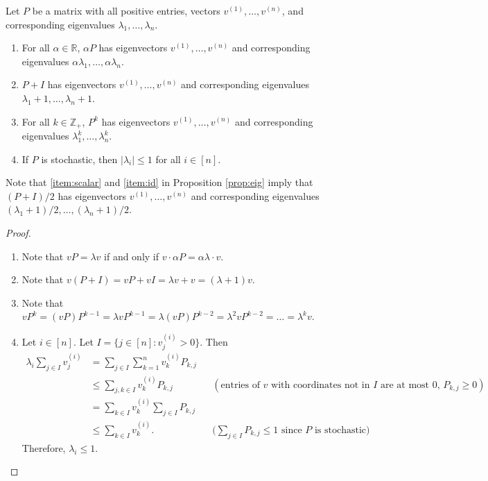 \documentclass[letterpaper, reqno,11pt]{article}
\newcommand{\RR}{\mathbb{R}}
\newcommand{\ZZ}{\mathbb{Z}}
\begin{document}
\begin{proposition} \label{prop:eig}
  Let $P$ be a matrix with all positive entries, vectors $v^{(1)}, \ldots, v^{(n)}$, and corresponding eigenvalues $\lambda_1, \ldots, \lambda_n$.
  \begin{enumerate}[itemsep=0pt, label=(\roman*)]
    \item \label{item:scalar} For all $\alpha \in \RR$, $\alpha P$ has eigenvectors $v^{(1)}, \ldots, v^{(n)}$ and corresponding eigenvalues $\alpha \lambda_1, \ldots, \alpha \lambda_n$.
    \item \label{item:id} $P + I$ has eigenvectors $v^{(1)}, \ldots, v^{(n)}$ and corresponding eigenvalues $\lambda_1 + 1, \ldots, \lambda_n + 1$.
    \item For all $k \in \ZZ_+$, $P^k$ has eigenvectors $v^{(1)}, \ldots, v^{(n)}$ and corresponding eigenvalues $\lambda_1^k, \ldots, \lambda_n^k$.
    \item If $P$ is stochastic, then $|\lambda_i| \leq 1$ for all $i \in [n]$.
  \end{enumerate}
\end{proposition}

Note that \ref{item:scalar} and \ref{item:id} in Proposition \ref{prop:eig} imply that $(P + I)/2$ has eigenvectors $v^{(1)}, \ldots, v^{(n)}$ and corresponding eigenvalues $(\lambda_1 + 1)/2, \ldots, (\lambda_n + 1)/2$.

\begin{proof}
  \begin{enumerate}[itemsep=0pt, label=(\roman*)]
    \item Note that $vP = \lambda v$ if and only if $v \cdot \alpha P = \alpha \lambda \cdot v$.
    \item Note that $v(P + I) = vP + vI = \lambda v + v = (\lambda + 1)v$.
    \item Note that $vP^k = (vP)P^{k - 1} = \lambda vP^{k - 1} = \lambda (vP)P^{k - 2} = \lambda^2 vP^{k - 2} = \ldots = \lambda^k v$.
    \item Let $i \in [n]$. Let $I = \{ j \in [n] : v_j^{(i)} > 0 \}$. Then
    \begin{align*}
      \lambda_i \sum_{j \in I} v_j^{(i)} &= \sum_{j \in I} \sum_{k = 1}^n v_k^{(i)} P_{k, j} \\
      &\leq \sum_{j, k \in I} v_k^{(i)} P_{k, j} && (\text{entries of $v$ with coordinates not in $I$ are at most $0$, $P_{k, j} \geq 0$}) \\
      &= \sum_{k \in I} v_k^{(i)} \sum_{j \in I} P_{k, j} \\
      &\leq \sum_{k \in I} v_k^{(i)}. && \text{($\sum_{j \in I} P_{k, j} \leq 1$ since $P$ is stochastic)}
    \end{align*}
    Therefore, $\lambda_i \leq 1$.
  \end{enumerate}
\end{proof}
\end{document}

